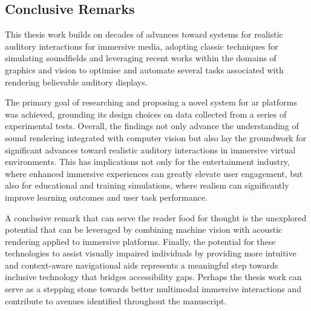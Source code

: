 \subsection{Conclusive Remarks}
This thesis work builds on decades of advances toward systems for realistic auditory interactions for immersive media, adopting classic techniques for simulating soundfields and leveraging recent works within the domains of graphics and vision to optimise and automate several tasks associated with rendering believable auditory displays.\par
The primary goal of researching and proposing a novel system for \acrshort{ar} platforms was achieved, grounding its design choices on data collected from a series of experimental tests. Overall, the findings not only advance the understanding of sound rendering integrated with computer vision but also lay the groundwork for significant advances toward realistic auditory interactions in immersive virtual environments. This has implications not only for the entertainment industry, where enhanced immersive experiences can greatly elevate user engagement, but also for educational and training simulations, where realism can significantly improve learning outcomes and user task performance.\par
A conclusive remark that can serve the reader food for thought is the unexplored potential that can be leveraged by combining machine vision with acoustic rendering applied to immersive platforms. Finally, the potential for these technologies to assist visually impaired individuals by providing more intuitive and context-aware navigational aids represents a meaningful step towards inclusive technology that bridges accessibility gaps. Perhaps the thesis work can serve as a stepping stone towards better multimodal immersive interactions and contribute to avenues identified throughout the manuscript.
